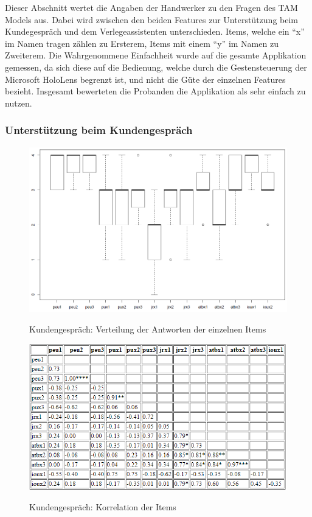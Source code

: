 Dieser Abschnitt wertet die Angaben der Handwerker zu den Fragen des TAM Models aus. Dabei wird zwischen den beiden Features zur Unterstützung beim Kundegespräch und dem Verlegeassistenten unterschieden. Items, welche ein \enquote{x} im Namen tragen zählen zu Ersterem, Items mit einem \enquote{y} im Namen zu Zweiterem. Die Wahrgenommene Einfachheit wurde auf die gesamte Applikation gemessen, da sich diese auf die Bedienung, welche durch die Gestensteuerung der Microsoft HoloLens begrenzt ist, und nicht die Güte der einzelnen Features bezieht. Insgesamt bewerteten die Probanden die Applikation als sehr einfach zu nutzen.

\subsubsection{Unterstützung beim Kundengespräch}
\label{kunde_show}

\begin{figure}[h]
	\begin{center}
		\includegraphics[scale=0.5]{Resources/Evaluation/tam_show.png}
		\label{tam_show}
		\caption{Kundengespräch: Verteilung der Antworten der einzelnen Items}	
	\end{center}
\end{figure}

\begin{figure}[H]
	\begin{center}
		\includegraphics[scale=0.7]{Resources/Evaluation/cor_show.png}
		\label{tam_showCor}
		\caption{Kundengespräch: Korrelation der Items}	
	\end{center}
\end{figure}

